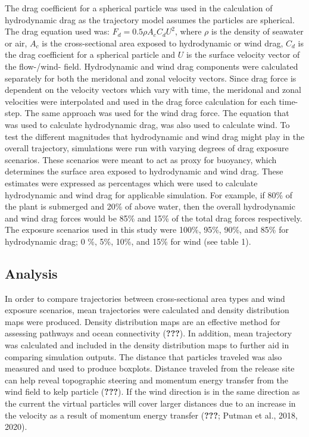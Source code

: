 \documentclass[
]{article}
\begin{document}
The drag coefficient for a spherical particle was used in the
calculation of hydrodynamic drag as the trajectory model assumes the
particles are spherical. The drag equation used was:
\(F_d = 0.5 \rho A_c C_d U^2\), where \(\rho\) is the density of
seawater or air, \(A_c\) is the cross-sectional area exposed to
hydrodynamic or wind drag, \(C_d\) is the drag coefficient for a
spherical particle and \(U\) is the surface velocity vector of the
flow-/wind- field. Hydrodynamic and wind drag components were calculated
separately for both the meridonal and zonal velocity vectors. Since drag
force is dependent on the velocity vectors which vary with time, the
meridonal and zonal velocities were interpolated and used in the drag
force calculation for each time-step. The same approach was used for the
wind drag force. The equation that was used to calculate hydrodynamic
drag, was also used to calculate wind. To test the different magnitudes
that hydrodynamic and wind drag might play in the overall trajectory,
simulations were run with varying degrees of drag exposure scenarios.
These scenarios were meant to act as proxy for buoyancy, which
determines the surface area exposed to hydrodynamic and wind drag. These
estimates were expressed as percentages which were used to calculate
hydrodynamic and wind drag for applicable simulation. For example, if
80\% of the plant is submerged and 20\% of above water, then the overall
hydrodynamic and wind drag forces would be 85\% and 15\% of the total
drag forces respectively. The exposure scenarios used in this study were
100\%, 95\%, 90\%, and 85\% for hydrodynamic drag; 0 \%, 5\%, 10\%, and
15\% for wind (see table 1).

\hypertarget{analysis}{%
\subsection{Analysis}\label{analysis}}

In order to compare trajectories between cross-sectional area types and
wind exposure scenarios, mean trajectories were calculated and density
distribution maps were produced. Density distribution maps are an
effective method for assessing pathways and ocean connectivity
({\textbf{???}}). In addition, mean trajectory was calculated and
included in the density distribution maps to further aid in comparing
simulation outputs. The distance that particles traveled was also
measured and used to produce boxplots. Distance traveled from the
release site can help reveal topographic steering and momentum energy
transfer from the wind field to kelp particle ({\textbf{???}}). If the
wind direction is in the same direction as the current the virtual
particles will cover larger distances due to an increase in the velocity
as a result of momentum energy transfer ({\textbf{???}}; Putman et al.,
2018, 2020).
\end{document}
